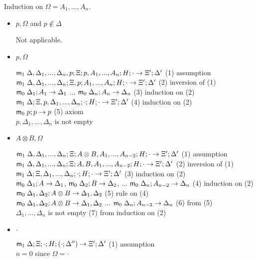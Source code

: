 Induction on $\Omega = A_1, ..., A_n$.

\begin{itemize}
\item $p, \Omega$ and $p \notin \Delta$

Not applicable.

\item $p, \Omega$

$\mathsf{m}_1 \; \Delta, \Delta_1, ..., \Delta_n, p; \Xi; p, A_1, ..., A_n; H; \cdot \rightarrow \Xi'; \Delta'$ \hfill (1) assumption \\
$\mathsf{m}_1 \; \Delta, \Delta_1, ..., \Delta_n; \Xi, p; A_1, ..., A_n; H; \cdot \rightarrow \Xi'; \Delta'$ \hfill (2) inversion of (1) \\
$\mathsf{m}_0 \; \Delta_1 ; A_1 \rightarrow \Delta_1$ ... $\mathsf{m}_0 \; \Delta_n ; A_n \rightarrow \Delta_n$ \hfill (3) induction on (2) \\
$\mathsf{m}_1 \; \Delta; \Xi, p, \Delta_1, ..., \Delta_n; \cdot ; H ; \cdot \rightarrow \Xi'; \Delta'$ \hfill (4) induction on (2) \\
$\mathsf{m}_0 \; p; p \rightarrow p$ \hfill (5) axiom \\
$p, \Delta_1, ..., \Delta_n$ is not empty\\

\item $A \otimes B, \Omega$

$\mathsf{m}_1 \; \Delta, \Delta_1, ..., \Delta_n; \Xi; A \otimes B, A_1, ..., A_{n-2}; H; \cdot \rightarrow \Xi'; \Delta'$ \hfill (1) assumption \\
$\mathsf{m}_1 \; \Delta, \Delta_1, ..., \Delta_n; \Xi; A, B, A_1, ..., A_{n-2}; H; \cdot \rightarrow \Xi'; \Delta'$ \hfill (2) inversion of (1) \\
$\mathsf{m}_1 \; \Delta; \Xi, \Delta_1, ..., \Delta_n; \cdot ; H; \cdot \rightarrow \Xi'; \Delta'$ \hfill (3) induction on (2) \\
$\mathsf{m}_0 \; \Delta_1 ; A \rightarrow \Delta_1$, \; $\mathsf{m}_0 \; \Delta_2; B \rightarrow \Delta_2$, \; ... \; $\mathsf{m}_0 \; \Delta_n; A_{n-2} \rightarrow \Delta_n$ \hfill (4) induction on (2) \\
$\mathsf{m}_0 \; \Delta_1, \Delta_2; A \otimes B \rightarrow \Delta_1, \Delta_2$ \hfill (5) rule on (4) \\
$\mathsf{m}_0 \; \Delta_1, \Delta_2; A \otimes B \rightarrow \Delta_1, \Delta_2$ \; ... \; $\mathsf{m}_0 \; \Delta_n; A_{n-2} \rightarrow \Delta_n$ \hfill (6) from (5) \\
$\Delta_1, ..., \Delta_n$ is not empty \hfill (7) from induction on (2) \\

\item $\cdot$

$\mathsf{m}_1 \; \Delta ; \Xi; \cdot ; H; (\cdot ; \Delta'') \rightarrow \Xi'; \Delta'$ \hfill (1) assumption \\
$n = 0$ \hfill since $\Omega = \cdot$ \\

\end{itemize}

